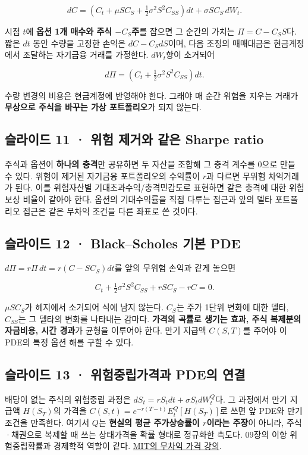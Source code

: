 \documentclass[11pt,a4paper]{article}
\begin{document}
\[
dC=(C_t+\mu S C_S+\tfrac12\sigma^2S^2C_{SS})dt
+\sigma S C_S\,dW_t.
\]

시점 $t$에 \textbf{옵션 1개 매수와 주식 $-C_S$주}를 잡으면 그 순간의 가치는 $\Pi=C-C_SS$다. 짧은 $dt$ 동안 수량을 고정한 손익은 $dC-C_SdS$이며, 다음 조정의 매매대금은 현금계정에서 조달하는 자기금융 거래를 가정한다. $dW_t$항이 소거되어\par

\[
d\Pi=(C_t+\tfrac12\sigma^2S^2C_{SS})dt.
\]

수량 변경의 비용은 현금계정에 반영해야 한다. 그래야 매 순간 위험을 지우는 거래가 \textbf{무상으로 주식을 바꾸는 가상 포트폴리오}가 되지 않는다.\par

\subsection{슬라이드 11 · 위험 제거와 같은 Sharpe ratio}
주식과 옵션이 \textbf{하나의 충격}만 공유하면 두 자산을 조합해 그 충격 계수를 0으로 만들 수 있다. 위험이 제거된 자기금융 포트폴리오의 수익률이 $r$과 다르면 무위험 차익거래가 된다. 이를 위험자산별 기대초과수익/충격민감도로 표현하면 같은 충격에 대한 위험보상 비율이 같아야 한다. 옵션의 기대수익률을 직접 다루는 접근과 앞의 델타 포트폴리오 접근은 같은 무차익 조건을 다른 좌표로 쓴 것이다.\par

\subsection{슬라이드 12 · Black–Scholes 기본 PDE}
$d\Pi=r\Pi\,dt=r(C-SC_S)dt$를 앞의 무위험 손익과 같게 놓으면\par

\[
\boxed{C_t+\tfrac12\sigma^2S^2C_{SS}+rSC_S-rC=0.}
\]

$\mu SC_S$가 헤지에서 소거되어 식에 남지 않는다. $C_S$는 주가 1단위 변화에 대한 델타, $C_{SS}$는 그 델타의 변화를 나타내는 감마다. \textbf{가격의 곡률로 생기는 효과, 주식 복제분의 자금비용, 시간 경과}가 균형을 이루어야 한다. 만기 지급액 $C(S,T)$를 주어야 이 PDE의 특정 옵션 해를 구할 수 있다.\par

\subsection{슬라이드 13 · 위험중립가격과 PDE의 연결}
배당이 없는 주식의 위험중립 과정은 $dS_t=rS_tdt+\sigma S_tdW_t^Q$다. 그 과정에서 만기 지급액 $H(S_T)$의 가격을 $C(S,t)=e^{-r(T-t)}E_t^Q[H(S_T)]$로 쓰면 앞 PDE와 만기조건을 만족한다. 여기서 $Q$는 \textbf{현실의 평균 주가상승률이 $r$이라는 주장}이 아니라, 주식·채권으로 복제할 때 쓰는 상태가격을 확률 형태로 정규화한 측도다. 09장의 이항 위험중립확률과 경제학적 역할이 같다. \href{https://ocw.mit.edu/courses/15-401-finance-theory-i-fall-2008/pages/video-lectures-and-slides/options/}{MIT의 무차익 가격 강의}.\par
\end{document}

